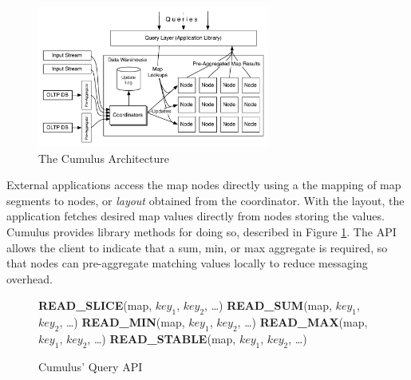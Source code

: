 \documentclass{vldb}
\begin{document}
\begin{figure}
\includegraphics[width=3in]{graphics/Architecture.pdf}
\caption{The Cumulus Architecture}
\label{fig:architecture}
\end{figure}

External applications access the map nodes directly using a the mapping of map segments to nodes, or \textit{layout} obtained from the coordinator.  With the layout, the application fetches desired map values directly from nodes storing the values.  Cumulus provides library methods for doing so, described in Figure \ref{fig:architecture}.  The API allows the client to indicate that a sum, min, or max aggregate is required, so that nodes can pre-aggregate matching values locally to reduce messaging overhead.

\begin{figure}
\begin{algorithmic}
\STATE \textbf{READ\_SLICE}(map, $key_1$, $key_2$, \ldots)
\STATE {}
\STATE \textbf{READ\_SUM}(map, $key_1$, $key_2$, \ldots)
\STATE \textbf{READ\_MIN}(map, $key_1$, $key_2$, \ldots)
\STATE \textbf{READ\_MAX}(map, $key_1$, $key_2$, \ldots)
\STATE {}
\STATE \textbf{READ\_STABLE}(map, $key_1$, $key_2$, \ldots)
\STATE {}
\end{algorithmic}
\caption{Cumulus' Query API}
\label{fig:queryapi}
\end{figure}
\end{document}
